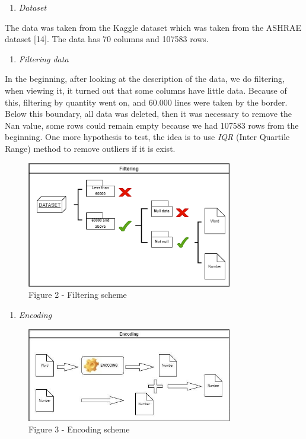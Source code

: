 \begin{multicols}{2}
\begin{enumerate}
\def\labelenumi{\Alph{enumi}.}
\item
  \emph{Dataset}
\end{enumerate}

The data was taken from the Kaggle dataset which was taken from the
ASHRAE dataset {[}14{]}. The data has 70 columns and 107583 rows.

\begin{enumerate}
\def\labelenumi{\Alph{enumi}.}
\setcounter{enumi}{1}
\item
  \emph{Filtering data}
\end{enumerate}

In the beginning, after looking at the description of the data, we do
filtering, when viewing it, it turned out that some columns have little
data. Because of this, filtering by quantity went on, and 60.000 lines
were taken by the border. Below this boundary, all data was deleted,
then it was necessary to remove the Nan value, some rows could remain
empty because we had 107583 rows from the beginning. One more hypothesis
to test, the idea is to use \emph{IQR} (Inter Quartile Range) method to
remove outliers if it is exist.
\end{multicols}

\begin{figure}[H]
	\centering
	\includegraphics[width=0.8\textwidth]{media/ict/image18}
	\caption*{Figure 2 - Filtering scheme}
\end{figure}

\begin{enumerate}
\def\labelenumi{\Alph{enumi}.}
\setcounter{enumi}{2}
\item
  \emph{Encoding}
\end{enumerate}

\begin{figure}[H]
	\centering
	\includegraphics[width=0.8\textwidth]{media/ict/image19}
	\caption*{Figure 3 - Encoding scheme}
\end{figure}

